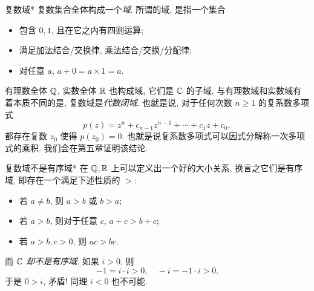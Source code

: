 


\begin{frame}{复数域*}
\onslide<+->复数集合全体构成一个\emph{域}.
\onslide<+->所谓的域, 是指一个集合
\begin{itemize}
\item 包含 $0,1$, 且在它之内有四则运算;
\item 满足加法结合/交换律, 乘法结合/交换/分配律;
\item 对任意 $a$, $a+0=a\times 1=a$.
\end{itemize}
\onslide<+->有理数全体 ${\mathbb{Q}}$, 实数全体 ${\mathbb{R}}$ 也构成域, 它们是 ${\mathbb{C}}$ 的子域.
\onslide<+->与有理数域和实数域有着本质不同的是, 复数域是\emph{代数闭域}.
\onslide<+->也就是说, 对于任何次数 $n\ge 1$ 的复系数多项式
	\[p(z)=z^n+c_{n-1}z^{n-1}+\cdots+c_1z+c_0,\]
\onslide<+->都存在复数 $z_0$ 使得 $p(z_0)=0$.
\onslide<+->也就是说复系数多项式可以因式分解称一次多项式的乘积.
\onslide<+->我们会在第五章证明该结论.
\end{frame}


\begin{frame}{复数域不是有序域*}
\onslide<+->在 ${\mathbb{Q}},{\mathbb{R}}$ 上可以定义出一个好的大小关系,
\onslide<+->换言之它们是有序域, 即存在一个满足下述性质的 $>$:
\begin{itemize}
\item 若 $a\neq b$, 则 $a>b$ 或 $b>a$;
\item 若 $a>b$, 则对于任意 $c$, $a+c>b+c$;
\item 若 $a>b,c>0$, 则 $ac>bc$.
\end{itemize}
\onslide<+->而 \emph{${\mathbb{C}}$ 却不是有序域}.
\onslide<+->如果 $i>0$, 则
	\[-1=i\cdot i>0,\quad -i=-1\cdot i>0.\]
\onslide<+->于是 $0>i$, 矛盾! 同理 $i<0$ 也不可能.
\end{frame}


